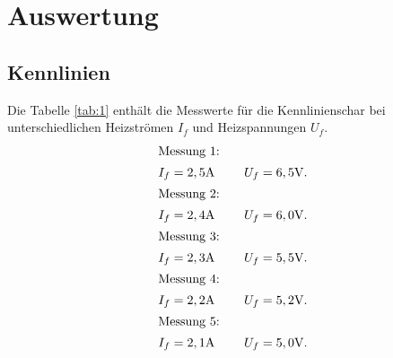 \section{Auswertung}
\label{sec:Auswertung}
\subsection{Kennlinien}
Die Tabelle \ref{tab:1} enthält die Messwerte für die Kennlinienschar
bei unterschiedlichen Heizströmen $I_{f}$ und Heizspannungen $U_f$.
\begin{align*}
\intertext{Messung 1:}  I_f&=2,5\si{\ampere} \ \ \ \ &U_f=6,5\si{\volt}.\\
\intertext{Messung 2:}  I_f&=2,4\si{\ampere} \ \ \ \ &U_f=6,0\si{\volt}.\\
\intertext{Messung 3:}  I_f&=2,3\si{\ampere} \ \ \ \ &U_f=5,5\si{\volt}.\\
\intertext{Messung 4:}  I_f&=2,2\si{\ampere} \ \ \ \ &U_f=5,2\si{\volt}.\\
\intertext{Messung 5:}  I_f&=2,1\si{\ampere} \ \ \ \ &U_f=5,0\si{\volt}.
\end{align*}


